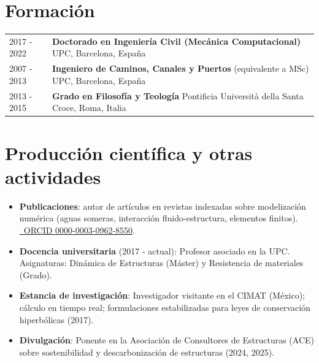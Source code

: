 \documentclass[11pt]{article}
\begin{document}
\section{Formación}
\begin{tabularx}{\linewidth}{lX}
    2017 - 2022 &
    \textbf{Doctorado en Ingeniería Civil (Mecánica Computacional)} \newline
    UPC, Barcelona, España \\

    2007 - 2013 &
    \textbf{Ingeniero de Caminos, Canales y Puertos} (equivalente a MSc) \newline
    UPC, Barcelona, España \\

    2013 - 2015 &
    \textbf{Grado en Filosofía y Teología} \newline
    Pontificia Università della Santa Croce, Roma, Italia \\
\end{tabularx}


\section{Producción científica y otras actividades}
\begin{itemize}
    \itemsep=-.3em
    \item \textbf{Publicaciones}: autor de artículos en revistas indexadas sobre modelización numérica (aguas someras, interacción fluido-estructura, elementos finitos). \href{https://orcid.org/0000-0003-0962-8550}{\faOrcid \ ORCID 0000-0003-0962-8550}.
    \item \textbf{Docencia universitaria} (2017 - actual): Profesor asociado en la UPC. Asignaturas: Dinámica de Estructuras (Máster) y Resistencia de materiales (Grado).
    \item \textbf{Estancia de investigación}: Investigador visitante en el CIMAT (México); cálculo en tiempo real; formulaciones estabilizadas para leyes de conservación hiperbólicas (2017).
    \item \textbf{Divulgación}: Ponente en la Asociación de Consultores de Estructuras (ACE) sobre sostenibilidad y descarbonización de estructuras (2024, 2025).
\end{itemize}
\end{document}

